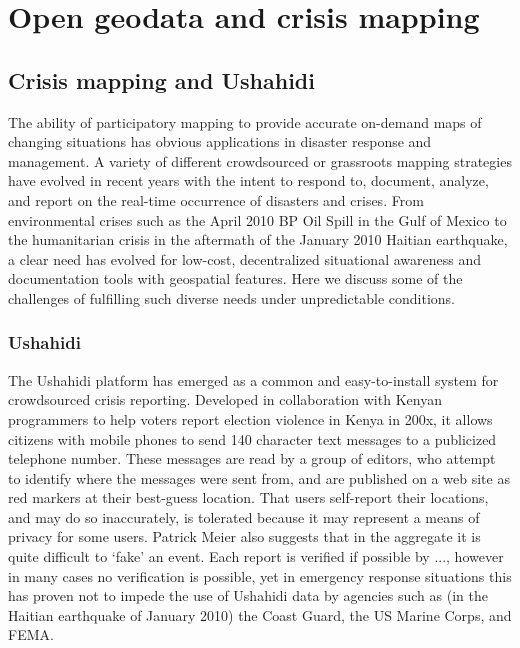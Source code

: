 \documentclass[11pt,oneside,notitlepage]{report}
\begin{document}
\section{Open geodata and crisis mapping}
\subsection{Crisis mapping and Ushahidi}

The ability of participatory mapping to provide accurate on-demand maps of changing situations has obvious applications in disaster response and management. A variety of different crowdsourced or grassroots mapping strategies have evolved in recent years with the intent to respond to, document, analyze, and report on the real-time occurrence of disasters and crises. From environmental crises such as the April 2010 BP Oil Spill in the Gulf of Mexico to the humanitarian crisis in the aftermath of the January 2010 Haitian earthquake, a clear need has evolved for low-cost, decentralized situational awareness and documentation tools with geospatial features. Here we discuss some of the challenges of fulfilling such diverse needs under unpredictable conditions.

\subsubsection{Ushahidi}

The Ushahidi platform has emerged as a common and easy-to-install system for crowdsourced crisis reporting. Developed in collaboration with Kenyan programmers to help voters report election violence in Kenya in 200x, it allows citizens with mobile phones to send 140 character text messages to a publicized telephone number. \cite{okolloh2009ushahidi} These messages are read by a group of editors, who attempt to identify where the messages were sent from, and are published on a web site as red markers at their best-guess location. That users self-report their locations, and may do so inaccurately, is tolerated because it may represent a means of privacy for some users. Patrick Meier also suggests that in the aggregate it is quite difficult to `fake' an event. \cite{meier2010wag} Each report is verified if possible by ..., however in many cases no verification is possible, yet in emergency response situations this has proven not to impede the use of Ushahidi data by agencies such as (in the Haitian earthquake of January 2010) the Coast Guard, the US Marine Corps, and FEMA. \cite{meier2010crowdsorcerors}\cite{meier2010ushahidi} 
\end{document}
